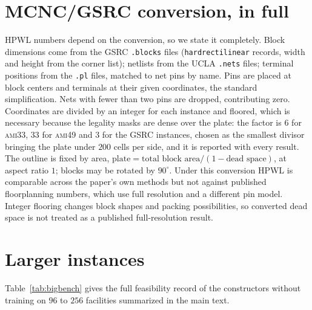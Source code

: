 \documentclass[11pt]{article}
\begin{document}
\section{MCNC/GSRC conversion, in full}
\label{app:conversion}
HPWL numbers depend on the conversion, so we state it completely. Block
dimensions come from the GSRC \texttt{.blocks} files
(\texttt{hardrectilinear} records, width and height from the corner list);
netlists from the UCLA \texttt{.nets} files; terminal positions from the
\texttt{.pl} files, matched to net pins by name. Pins are placed at block centers and
terminals at their given coordinates, the standard simplification. Nets with
fewer than two pins are dropped, contributing zero. Coordinates are divided by
an integer for each instance and floored, which is necessary because the legality
masks are dense over the plate: the factor is $6$ for \textsc{ami33}, $33$
for \textsc{ami49} and $3$ for the GSRC instances, chosen as the smallest
divisor bringing the plate under $200$ cells per side, and it is reported with
every result. The outline is fixed by area,
$\text{plate}=\text{total block area}/(1-\text{dead space})$, at aspect
ratio $1$; blocks may be rotated by $90^\circ$. Under this conversion HPWL is
comparable across the paper's own methods but not against published
floorplanning numbers, which use full resolution and a different pin model.
Integer flooring changes block shapes and packing possibilities, so converted
dead space is not treated as a published full-resolution result.

\section{Larger instances}
\label{app:bigbench}
Table~\ref{tab:bigbench} gives the full feasibility record of the
constructors without training on $96$ to $256$ facilities summarized in the main
text.
\end{document}
